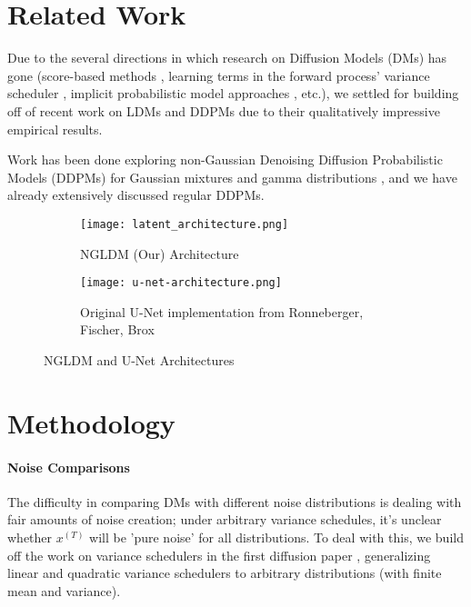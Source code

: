 \documentclass[10pt,twocolumn,letterpaper]{article}
\begin{document}
\section{Related Work}
\label{sec:intro}

Due to the several directions in which research on Diffusion Models (DMs) has gone (score-based methods \cite{DBLP:journals/corr/abs-2011-13456}, learning terms in the forward process' variance scheduler \cite{DBLP:journals/corr/abs-2006-11239}, implicit probabilistic model approaches \cite{DBLP:journals/corr/abs-2010-02502}, etc.), we settled for building off of recent work on LDMs and DDPMs due to their qualitatively impressive empirical results.

Work has been done exploring non-Gaussian Denoising Diffusion Probabilistic Models (DDPMs) for Gaussian mixtures and gamma distributions \cite{DBLP:journals/corr/abs-2106-07582}, and we have already extensively discussed regular DDPMs.

\begin{figure*}
  \centering
  \begin{subfigure}{0.68\linewidth}
    \texttt{[image: latent\_architecture.png]}
    \caption{NGLDM (Our) Architecture}
    \label{fig:short-a}
  \end{subfigure}
  \hfill
  \begin{subfigure}{0.28\linewidth}
    \texttt{[image: u-net-architecture.png]}
    \caption{Original U-Net implementation from Ronneberger, Fischer, Brox \cite{DBLP:journals/corr/RonnebergerFB15}}
    \label{fig:short-b}
  \end{subfigure}
  \caption{NGLDM and U-Net Architectures}
  \label{fig:short}
\end{figure*}

\section{Methodology}
\label{sec:intro}

\paragraph{\textbf{Noise Comparisons}} The difficulty in comparing DMs with different noise distributions is dealing with fair amounts of noise creation; under arbitrary variance schedules, it's unclear whether $x^{(T)}$ will be 'pure noise' for all distributions. To deal with this, we build off the work on variance schedulers in the first diffusion paper \cite{DBLP:journals/corr/Sohl-DicksteinW15}, generalizing linear and quadratic variance schedulers to arbitrary distributions (with finite mean and variance).
\end{document}
